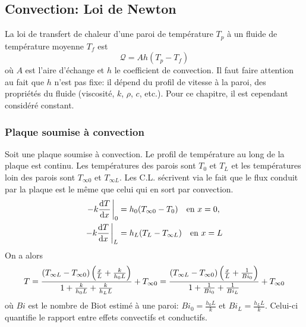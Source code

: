     \subsection{Convection: Loi de Newton}
      La loi de transfert de chaleur d'une paroi de température $T_p$ à un fluide de température moyenne $T_f$ est
      \begin{equation}
        \mathcal{Q} = Ah(T_p - T_f)
      \end{equation}
      où $A$ est l'aire d'échange et $h$ le coefficient de convection. Il faut faire attention au fait que $h$ n'est pas fixe: il dépend du profil de vitesse à la paroi, des propriétés du fluide (viscosité, $k$, $\rho$, $c$, etc.). Pour ce chapitre, il est cependant considéré constant.
      \subsubsection{Plaque soumise à convection}
        Soit une plaque soumise à convection. Le profil de température au long de la plaque est continu. Les températures des parois sont $T_0$ et $T_L$ et les températures loin des parois sont $T_{\infty 0}$ et $T_{\infty L}$. Les C.L. sécrivent via le fait que le flux conduit par la plaque est le même que celui qui en sort par convection.
        \begin{equation}
          \begin{aligned}
            -k \dv{T}{x} \eval_0 &= h_0 (T_{\infty 0} - T_0) \quad \textrm{en } x = 0,\\
            -k \dv{T}{x} \eval_L &= h_L (T_{L} - T_{\infty L}) \quad \textrm{en } x = L
          \end{aligned}
        \end{equation}
        On a alors
        \begin{equation}
          T = \frac{(T_{\infty L} - T_{\infty 0})\left(\frac{x}{L} + \frac{k}{h_0 L}\right)}{1 + \frac{k}{h_0 L} + \frac{k}{h_L L}} + T_{\infty 0}
          = \frac{(T_{\infty L} - T_{\infty 0})\left(\frac{x}{L} + \frac{1}{Bi_0}\right)}{1 + \frac{1}{Bi_0} + \frac{1}{Bi_L}} + T_{\infty 0}
        \end{equation}
        où $Bi$ est le nombre de Biot estimé à une paroi: $Bi_0 = \frac{h_0 L}{k}$ et $Bi_L = \frac{h_L L}{k}$. Celui-ci quantifie le rapport entre effets convectifs et conductifs.

